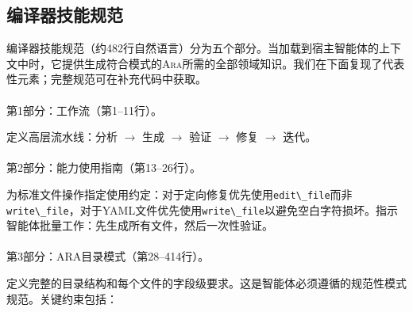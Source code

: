\documentclass[
]{article}
\makeatletter
\let\oldparagraph\paragraph
\renewcommand{\paragraph}{
    \@ifstar
      \xxxParagraphStar
      \xxxParagraphNoStar
  }
\newcommand{\xxxParagraphStar}[1]{\oldparagraph*{#1}\mbox{}}
\newcommand{\xxxParagraphNoStar}[1]{\oldparagraph{#1}\mbox{}}
\newcommand{\passthrough}[1]{#1}
\theoremstyle{definition}
\newcommand{\ara}{\textsc{Ara}}
\makeatother
\begin{document}
\subsection{编译器技能规范}\label{sec-app-ingestor-prompt}

编译器技能规范（约482行自然语言）分为五个部分。当加载到宿主智能体的上下文中时，它提供生成符合模式的\ara{}所需的全部领域知识。我们在下面复现了代表性元素；完整规范可在补充代码中获取。

\paragraph{第1部分：工作流（第1--11行）。}\label{ux7b2c1ux90e8ux5206ux5de5ux4f5cux6d41ux7b2c111ux884c}

定义高层流水线：分析 \(\to\) 生成 \(\to\) 验证 \(\to\) 修复 \(\to\)
迭代。

\paragraph{第2部分：能力使用指南（第13--26行）。}\label{ux7b2c2ux90e8ux5206ux80fdux529bux4f7fux7528ux6307ux5357ux7b2c1326ux884c}

为标准文件操作指定使用约定：对于定向修复优先使用\passthrough{\lstinline!edit\_file!}而非\passthrough{\lstinline!write\_file!}，对于YAML文件优先使用\passthrough{\lstinline!write\_file!}以避免空白字符损坏。指示智能体批量工作：先生成所有文件，然后一次性验证。

\paragraph{第3部分：ARA目录模式（第28--414行）。}\label{ux7b2c3ux90e8ux5206araux76eeux5f55ux6a21ux5f0fux7b2c28414ux884c}

定义完整的目录结构和每个文件的字段级要求。这是智能体必须遵循的规范性模式规范。关键约束包括：
\end{document}
